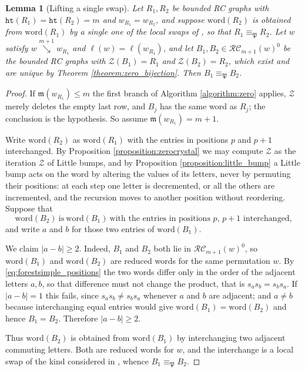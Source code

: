 \documentclass{amsart}
\newtheorem{lemma}{Lemma}[subsection]
\theoremstyle{definition}
\theoremstyle{remark}
\numberwithin{equation}{subsection}
\newcommand{\downvar}[1]{\stackrel{#1}{\searrow}}
\newcommand{\wof}[1]{w_{#1}}
\newcommand{\zeromap}{\mathcal{Z}}
\newcommand{\hr}{\mathtt{ht}}
\newcommand{\RC}{\mathcal{RC}}
\newcommand{\lzeromap}{\mathscr{Z}}
\newcommand{\forest}{\mathfrak{P}}
\newcommand{\maxd}{\mathfrak{m}}
\begin{document}
\begin{lemma}[Lifting a single swap]\label{lemma:forestsimple}
Let $R_1,R_2$ be bounded RC graphs with $\hr(R_1)=\hr(R_2)=m$ and $\wof{R_1}=\wof{R_2}$, and suppose $\mathrm{word}(R_2)$ is obtained from $\mathrm{word}(R_1)$ by a single one of the local swaps of \cite[Proposition~5.8]{nadeau2024forest}, so that $R_1\equiv_\forest R_2$. Let $w$ satisfy $w\downvar{m+1}\wof{R_1}$ and $\ell(w)=\ell(\wof{R_1})$, and let $B_1,B_2\in\RC_{m+1}(w)^0$ be the bounded RC graphs with $\zeromap(B_1)=R_1$ and $\zeromap(B_2)=R_2$, which exist and are unique by Theorem \ref{theorem:zero_bijection}. Then $B_1\equiv_\forest B_2$.
\end{lemma}
\begin{proof}
If $\maxd(\wof{R_1})\leq m$ the first branch of Algorithm \ref{algorithm:zero} applies, $\zeromap$ merely deletes the empty last row, and $B_j$ has the same word as $R_j$; the conclusion is the hypothesis. So assume $\maxd(\wof{R_1})=m+1$.

Write $\mathrm{word}(R_2)$ as $\mathrm{word}(R_1)$ with the entries in positions $p$ and $p+1$ interchanged. By Proposition \ref{proposition:zerocrystal} we may compute $\zeromap$ as the iteration $\lzeromap$ of Little bumps, and by Proposition \ref{proposition:little_bump} a Little bump acts on the word by altering the values of its letters, never by permuting their positions: at each step one letter is decremented, or all the others are incremented, and the recursion moves to another position without reordering. Suppose that
\begin{equation}\label{eq:forestsimple_positions}
\mathrm{word}(B_2)\ \text{is}\ \mathrm{word}(B_1)\ \text{with the entries in positions } p,\,p+1 \text{ interchanged,}
\end{equation}
and write $a$ and $b$ for those two entries of $\mathrm{word}(B_1)$.

We claim $|a-b|\geq 2$. Indeed, $B_1$ and $B_2$ both lie in $\RC_{m+1}(w)^0$, so $\mathrm{word}(B_1)$ and $\mathrm{word}(B_2)$ are reduced words for the same permutation $w$. By \eqref{eq:forestsimple_positions} the two words differ only in the order of the adjacent letters $a,b$, so that difference must not change the product, that is $s_as_b=s_bs_a$. If $|a-b|=1$ this fails, since $s_as_b\neq s_bs_a$ whenever $a$ and $b$ are adjacent; and $a\neq b$ because interchanging equal entries would give $\mathrm{word}(B_1)=\mathrm{word}(B_2)$ and hence $B_1=B_2$. Therefore $|a-b|\geq 2$.

Thus $\mathrm{word}(B_2)$ is obtained from $\mathrm{word}(B_1)$ by interchanging two adjacent commuting letters. Both are reduced words for $w$, and the interchange is a local swap of the kind considered in \cite[Proposition~5.8]{nadeau2024forest}, whence $B_1\equiv_\forest B_2$.
\end{proof}
\end{document}
